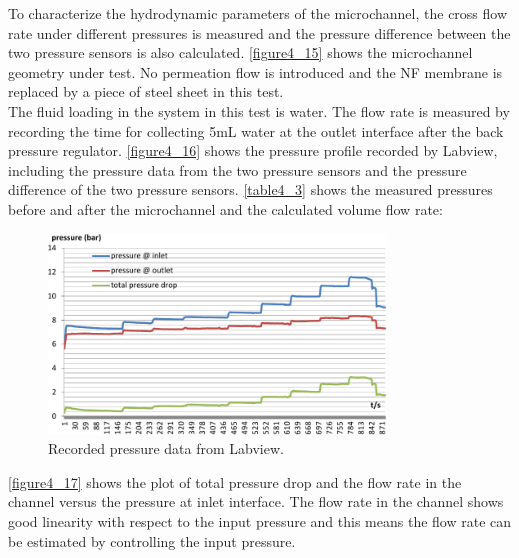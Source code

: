 To characterize the hydrodynamic parameters of the microchannel, the cross flow rate under different pressures is measured and the pressure difference between the two pressure sensors is also calculated. \autoref{figure4_15} shows the microchannel geometry under test. No permeation flow is introduced and the NF membrane is replaced by a piece of steel sheet in this test.\\



The fluid loading in the system in this test is water. The flow rate is measured by recording the time for collecting 5mL water at the outlet interface after the back pressure regulator. \autoref{figure4_16} shows the pressure profile recorded by Labview, including the pressure data from the two pressure sensors and the pressure difference of the two pressure sensors. \autoref{table4_3} shows the measured pressures before and after the microchannel and the calculated volume flow rate:

\begin{figure}[ht]%
\centering
\includegraphics[width=0.8\textwidth]{figures/packagingandtestunderhighpressure/figure4_16}%
\caption{Recorded pressure data from Labview.}%
\label{figure4_16}%
\end{figure}

\autoref{figure4_17} shows the plot of total pressure drop and the flow rate in the channel versus the pressure at inlet interface. The flow rate in the channel shows good linearity with respect to the input pressure and this means the flow rate can be estimated by controlling the input pressure.\\
\clearpage

